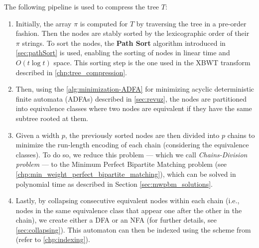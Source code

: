 The following pipeline is used to compress the tree $T$:
\begin{enumerate}
    \item Initially, the array $\pi$ is computed for $T$ by traversing the tree in a pre-order fashion. Then the nodes are stably sorted by the lexicographic order of their $\pi$ strings. To sort the nodes, the \textbf{Path Sort} algorithm introduced in \cref{sec:pathSort} is used, enabling the sorting of nodes in linear time and $O(t \log t)$ space. This sorting step is the one used in the XBWT transform described in \cref{chp:tree_compression}.
    \item Then, using the \cref{alg:minimization-ADFA} for minimizing acyclic deterministic finite automata (ADFAs) described in \cref{sec:revuz}, the nodes are partitioned into equivalence classes where two nodes are equivalent if they have the same subtree rooted at them.
    \item Given a width $p$, the previously sorted nodes are then divided into $p$ chains to minimize the run-length encoding of each chain (considering the equivalence classes). To do so, we reduce this problem --- which we call \emph{Chains-Division problem} --- to the Minimum Perfect Bipartite Matching problem (see \cref{chp:min_weight_perfect_bipartite_matching}), which can be solved in polynomial time as described in Section \cref{sec:mwpbm_solutions}.
    \item Lastly, by collapsing consecutive equivalent nodes within each chain (i.e., nodes in the same equivalence class that appear one after the other in the chain), we create either a DFA or an NFA (for further details, see \cref{sec:collapsing}). This automaton can then be indexed using the scheme from \cite{cotumaccio2023co} (refer to \cref{chp:indexing}). %
\end{enumerate}